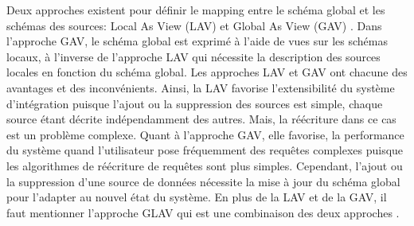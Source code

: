 Deux approches existent pour définir le mapping entre le schéma global et les schémas des sources: Local As View (LAV) et Global As View (GAV) \cite{Halevy2001}. Dans l’approche GAV, le schéma global est exprimé à l’aide de vues sur les schémas locaux, à l’inverse de l’approche LAV qui nécessite la description des sources locales en fonction du schéma global. Les approches LAV et GAV ont chacune des avantages et des inconvénients. Ainsi, la  LAV   favorise l’extensibilité   du   système   d’intégration   puisque   l’ajout   ou   la   suppression   des   sources   est   simple,   chaque source   étant   décrite   indépendamment   des   autres.   Mais,  la   réécriture   dans   ce   cas   est   un   problème complexe.   Quant   à   l’approche   GAV,   elle   favorise,   la   performance   du   système   quand   l’utilisateur   pose fréquemment   des   requêtes   complexes   puisque   les   algorithmes   de   réécriture   de   requêtes   sont   plus   simples. Cependant, l’ajout ou la suppression d’une source de données nécessite la mise à jour du schéma global pour l’adapter au nouvel état du système. En plus de la LAV et de la GAV, il faut mentionner l’approche GLAV qui est une combinaison des deux approches \cite{lenzerini2002}.\\


